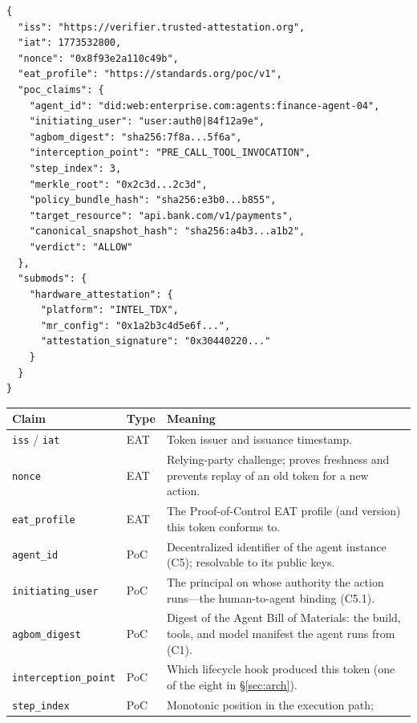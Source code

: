 \documentclass[11pt]{article}
\newcommand{\poc}{Proof-of-Control}
\begin{document}
\begin{listing}[p]
\begin{verbatim}
{
  "iss": "https://verifier.trusted-attestation.org",
  "iat": 1773532800,
  "nonce": "0x8f93e2a110c49b",
  "eat_profile": "https://standards.org/poc/v1",
  "poc_claims": {
    "agent_id": "did:web:enterprise.com:agents:finance-agent-04",
    "initiating_user": "user:auth0|84f12a9e",
    "agbom_digest": "sha256:7f8a...5f6a",
    "interception_point": "PRE_CALL_TOOL_INVOCATION",
    "step_index": 3,
    "merkle_root": "0x2c3d...2c3d",
    "policy_bundle_hash": "sha256:e3b0...b855",
    "target_resource": "api.bank.com/v1/payments",
    "canonical_snapshot_hash": "sha256:a4b3...a1b2",
    "verdict": "ALLOW"
  },
  "submods": {
    "hardware_attestation": {
      "platform": "INTEL_TDX",
      "mr_config": "0x1a2b3c4d5e6f...",
      "attestation_signature": "0x30440220..."
    }
  }
}
\end{verbatim}
\caption{A \poc{} Evidence token (EAT, JWT rendering) emitted at the
pre-call tool-invocation hook. Claim-by-claim definitions follow in
Table~\ref{tab:claims} below.}
\label{lst:eat}
\vspace{1.2em}
\centering\scriptsize
\begin{tabular}{@{}llp{8.1cm}@{}}
\toprule
\textbf{Claim} & \textbf{Type} & \textbf{Meaning} \\
\midrule
\texttt{iss} / \texttt{iat} & EAT & Token issuer and issuance timestamp. \\
\texttt{nonce} & EAT & Relying-party challenge; proves freshness and
prevents replay of an old token for a new action. \\
\texttt{eat\_profile} & EAT & The \poc{} EAT profile (and version) this
token conforms to. \\
\texttt{agent\_id} & PoC & Decentralized identifier of the agent instance
(C5); resolvable to its public keys. \\
\texttt{initiating\_user} & PoC & The principal on whose authority the
action runs---the human-to-agent binding (C5.1). \\
\texttt{agbom\_digest} & PoC & Digest of the Agent Bill of Materials: the
build, tools, and model manifest the agent runs from (C1). \\
\texttt{interception\_point} & PoC & Which lifecycle hook produced this
token (one of the eight in \S\ref{sec:arch}). \\
\texttt{step\_index} & PoC & Monotonic position in the execution path;

\end{tabular}
\end{listing}
\end{document}
